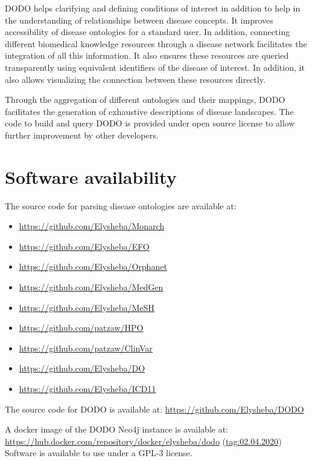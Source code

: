 \documentclass[9pt,a4paper,]{extarticle}
\begin{document}
DODO helps clarifying and defining conditions of interest in addition to help in the understanding of relationships between disease concepts. It improves accessibility of disease ontologies for a standard user. In addition, connecting different biomedical knowledge resources through a disease network facilitates the integration of all this information. It also ensures these resources are queried transparently using equivalent identifiers of the disease of interest. In addition, it also allows visualizing the connection between these resources directly.

Through the aggregation of different ontologies and their mappings, DODO facilitates the generation of exhaustive descriptions of disease landscapes. The code to build and query DODO is provided under open source license to allow further improvement by other developers.

\hypertarget{software-availability}{%
\section{Software availability}\label{software-availability}}

The source code for parsing disease ontologies are available at:

\begin{itemize}
\item
  \url{https://github.com/Elysheba/Monarch}
\item
  \url{https://github.com/Elysheba/EFO}
\item
  \url{https://github.com/Elysheba/Orphanet}
\item
  \url{https://github.com/Elysheba/MedGen}
\item
  \url{https://github.com/Elysheba/MeSH}
\item
  \url{https://github.com/patzaw/HPO}
\item
  \url{https://github.com/patzaw/ClinVar}
\item
  \url{https://github.com/Elysheba/DO}
\item
  \url{https://github.com/Elysheba/ICD11}
\end{itemize}

The source code for DODO is available at: \url{https://github.com/Elysheba/DODO}

A docker image of the DODO Neo4j instance is available at: \url{https://hub.docker.com/repository/docker/elysheba/dodo} (\url{tag:02.04.2020}) Software is available to use under a GPL-3 license.
\end{document}
